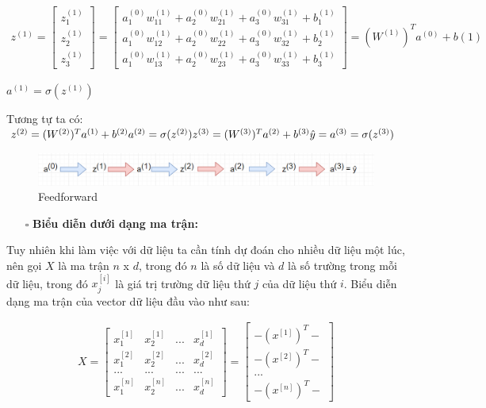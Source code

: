 \begin{align}
z^{(1)} =  \begin{bmatrix}z_{1}^{(1)}\\z_{2}^{(1)}\\z_{3}^{(1)}\end{bmatrix} 
=  \begin{bmatrix}a_{1}^{(0)}w_{11}^{(1)}+a_{2}^{(0)}w_{21}^{(1)}+a_{3}^{(0)}w_{31}^{(1)}+b_{1}^{(1)}\\a_{1}^{(0)}w_{12}^{(1)}+a_{2}^{(0)}w_{22}^{(1)}+a_{3}^{(0)}w_{32}^{(1)}+b_{2}^{(1)}\\a_{1}^{(0)}w_{13}^{(1)}+a_{2}^{(0)}w_{23}^{(1)}+a_{3}^{(0)}w_{33}^{(1)}+b_{3}^{(1)}\end{bmatrix} 
= (W^{(1)})^{T}a^{(0)} + b(1)
\end{align}

$a^{(1)} =  \sigma (z^{(1)})$

Tương tự ta có:
$\newline z^{(2)} = (W^{(2)})^T  a^{(1)} + b^{(2)}\newline  a^{(2)} = \sigma(z^{(2)}) \newline z^{(3)} = (W^{(3)})^T  a^{(2)} + b^{(3)}\newline  \hat{y} = a^{(3)} = \sigma(z^{(3)})$

\FloatBarrier
\begin{figure}[htp]
\begin{center}
\includegraphics[scale=0.75]{chap2/c2_figs/ff.png}
\end{center}
\caption{Feedforward}
\label{fig:feed_forward}
\end{figure}
\FloatBarrier

\begin{itemize}
\item[$\square$] \textbf{Biểu diễn dưới dạng ma trận:}
\end{itemize}
Tuy nhiên khi làm việc với dữ liệu ta cần tính dự đoán cho nhiều dữ liệu một lúc, nên gọi $X$ là ma trận $n$ x $d$, trong đó $n$ là số dữ liệu và $d$ là số trường trong mỗi dữ liệu, trong đó $x_j^{[i]}$ là giá trị trường dữ liệu thứ $j$ của dữ liệu thứ $i$.
Biểu diễn dạng ma trận của vector dữ liệu đầu vào như sau:

\begin{align}
X = \begin{bmatrix}x_{1}^{[1]}&x_{2}^{[1]}&...&x_{d}^{[1]}\\x_{1}^{[2]}&x_{2}^{[2]}&...&x_{d}^{[2]}\\...&...&...&...\\x_{1}^{[n]}&x_{2}^{[n]}&...&x_{d}^{[n]}\end{bmatrix} =  \begin{bmatrix}-(x^{[1]})^{T}-\\-(x^{[2]})^{T}-\\...\\-(x^{[n]})^{T}-\end{bmatrix} 
\end{align}

